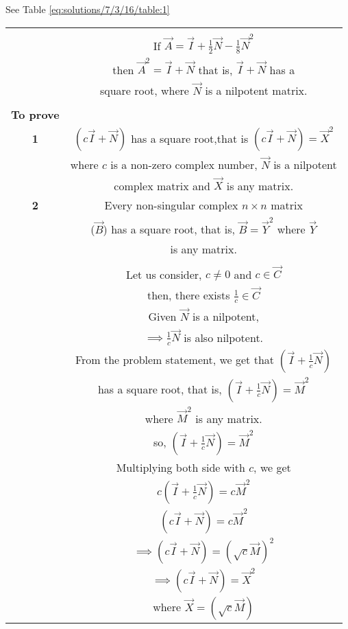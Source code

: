 See Table \ref{eq:solutions/7/3/16/table:1}

\onecolumn
\begin{longtable}{|c|c|}
\hline
\multirow{3}{*}{} & \\
\textbf{Given} & If $\vec{A}=\vec{I}+\frac{1}{2}\vec{N}-\frac{1}{8}\vec{N}^2$\\
& then $\vec{A}^2 = \vec{I}+\vec{N}$ that is, $\vec{I}+\vec{N}$ has a \\
& square root, where $\vec{N}$ is a nilpotent matrix.\\
& \\
\hline
\textbf{To prove} & \\
\hline
\textbf{1} & $(c\vec{I}+\vec{N})$ has a square root,that is $(c\vec{I}+\vec{N})= \vec{X}^2$\\
& where $c$ is a non-zero complex number, $\vec{N}$ is a nilpotent\\
&  complex matrix and $\vec{X}$ is any matrix.\\
\hline
\textbf{2} & Every non-singular complex $n \times n$ matrix \\
& ($\vec{B}$) has a square root, that is, $\vec{B} = \vec{Y}^2$ where $\vec{Y}$\\
&  is any matrix.\\
\hline
\multirow{3}{*}{} & \\
\textbf{Proof 1} & Let us consider, $c \neq 0$ and $c \in \vec{C}$\\
& then, there exists $\frac{1}{c} \in \vec{C}$\\
& Given $\vec{N}$ is a nilpotent, \\
& $\implies \frac{1}{c}\vec{N}$ is also nilpotent.\\
& From the problem statement, we get that $(\vec{I}+\frac{1}{c}\vec{N})$\\
& has a square root, that is, $(\vec{I}+\frac{1}{c}\vec{N}) = \vec{M}^2$\\
& where $\vec{M}^2$ is any matrix.\\
& so, $(\vec{I}+\frac{1}{c}\vec{N}) = \vec{M}^2$\\
& Multiplying both side with $c$, we get\\
& $c(\vec{I}+\frac{1}{c}\vec{N}) = c\vec{M}^2$\\
& $(c\vec{I}+\vec{N}) = c\vec{M}^2$\\
& $\implies (c\vec{I}+\vec{N}) = (\sqrt{c}\vec{M})^2$\\
& $\implies (c\vec{I}+\vec{N}) = \vec{X}^2$\\
& where $\vec{X} = (\sqrt{c}\vec{M})$\\

\end{longtable}
